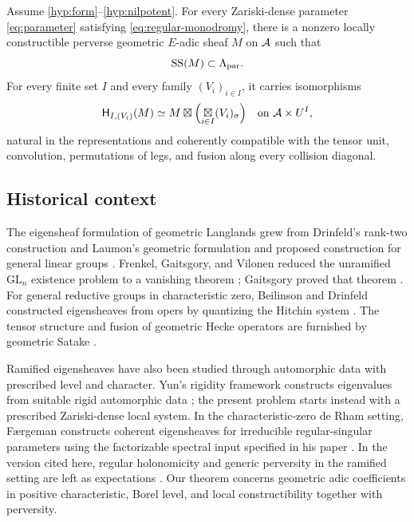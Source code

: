 \begin{theorem}\label{thm:main}
Assume \ref{hyp:form}--\ref{hyp:nilpotent}. For every Zariski-dense
parameter \eqref{eq:parameter} satisfying \eqref{eq:regular-monodromy},
there is a nonzero locally constructible perverse geometric $E$-adic sheaf
$M$ on $\mathcal A$ such that
\[
 \operatorname{SS}(M)\subset\Lambda_{\mathrm{par}}.
\]
For every finite set $I$ and every family $(V_i)_{i\in I}$, it carries
isomorphisms
\begin{equation}\label{eq:main-eigen}
 \mathsf H_{I,(V_i)}(M)
 \simeq M\boxtimes\Bigl(\mathop{\boxtimes}_{i\in I}(V_i)_\sigma\Bigr)
 \quad\text{on }\mathcal A\times U^I,
\end{equation}
natural in the representations and coherently compatible with the tensor
unit, convolution, permutations of legs, and fusion along every collision
diagonal.
\end{theorem}

\subsection{Historical context}
The eigensheaf formulation of geometric Langlands grew from Drinfeld's
rank-two construction and Laumon's geometric formulation and proposed
construction for general linear groups \cite{Drinfeld,Laumon}. Frenkel,
Gaitsgory, and Vilonen reduced the unramified $\mathrm{GL}_n$ existence
problem to a vanishing theorem \cite{FGV}; Gaitsgory proved that theorem
\cite{GaitsgoryVanishing}. For general reductive groups in characteristic
zero, Beilinson and Drinfeld constructed eigensheaves from opers by
quantizing the Hitchin system \cite[\S0.2]{BD}. The tensor structure and
fusion of geometric Hecke operators are furnished by geometric Satake
\cite[\S\S4--5,14]{MV}.

Ramified eigensheaves have also been studied through automorphic data with
prescribed level and character. Yun's rigidity framework constructs
eigenvalues from suitable rigid automorphic data
\cite[\S4]{YunRigidity}; the present problem starts instead with a prescribed
Zariski-dense local system. In the characteristic-zero de Rham setting,
F{\ae}rgeman constructs coherent eigensheaves for irreducible regular-singular
parameters using the factorizable spectral input specified in his paper
\cite[Theorem~1.4.1.1,\S1.3.7]{Faergeman}. In the version cited here, regular
holonomicity and generic perversity in the ramified setting are left as expectations
\cite[Remark~1.4.1.2]{Faergeman}. Our theorem concerns geometric adic
coefficients in positive characteristic, Borel level, and local
constructibility together with perversity.

